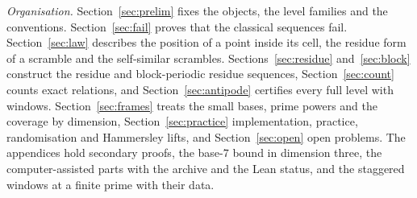 \emph{Organisation.} Section~\ref{sec:prelim} fixes the objects, the level families and the conventions. Section~\ref{sec:fail} proves that the classical sequences fail. Section~\ref{sec:law} describes the position of a point inside its cell, the residue form of a scramble and the self-similar scrambles. Sections~\ref{sec:residue} and~\ref{sec:block} construct the residue and block-periodic residue sequences, Section~\ref{sec:count} counts exact relations, and Section~\ref{sec:antipode} certifies every full level with windows. Section~\ref{sec:frames} treats the small bases, prime powers and the coverage by dimension, Section~\ref{sec:practice} implementation, practice, randomisation and Hammersley lifts, and Section~\ref{sec:open} open problems. The appendices hold secondary proofs, the base-$7$ bound in dimension three, the computer-assisted parts with the archive and the Lean status, and the staggered windows at a finite prime with their data.
